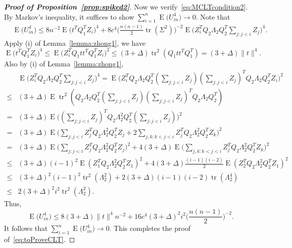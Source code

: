 \documentclass[3p]{elsarticle}
\DeclareMathOperator{\mytr}{tr}
\DeclareMathOperator{\myE}{E}
\theoremstyle{plain}
\theoremstyle{definition}
\theoremstyle{remark}
\begin{document}
\begin{proof}[\textbf{Proof of Proposition~\ref{prop:spiked2}}]
     Now we verify~\eqref{eq:MCLTcondition2}.
     By Markov's inequality, it suffices to show $\sum_{i=1}^n \myE\big(U_{in}^4\big)\to 0$.
     Note that
     $$
     \begin{aligned}
         &\myE\big(U_{in}^4\big)
         \leq
         8n^{-2}\myE \big(t^T Q_1^T Z_i\big)^4+
         8c^4  
         \big(\frac{n(n-1)}{2} \mytr(\Sigma^2)\big)^{-2}
         \myE\big( Z_i^T Q_2 \Lambda_2 Q_2^T \sum_{j:j<i}Z_j\big)^4.
     \end{aligned}
     $$
    Apply (i) of Lemma~\ref{lemma:zhong1}, we have
    $$
\myE \big(t^T Q_1^T Z_i\big)^4\leq
         \myE \big( Z_i^T Q_1 t t^T Q_1^T Z_i\big)^2
         \leq (3+\Delta)\mytr^2 (Q_1 t t^T Q_1^T)
         = (3+\Delta) \|t\|^4.
    $$
    Also by (i) of Lemma~\ref{lemma:zhong1},
    $$
    \begin{aligned}
        &
         \myE\big( Z_i^T Q_2 \Lambda_2 Q_2^T \sum_{j:j<i}Z_j\big)^4
         =
        \myE\big( Z_i^T Q_2 \Lambda_2 Q_2^T (\sum_{j:j<i}Z_j)(\sum_{j:j<i}Z_j)^T Q_2 \Lambda_2 Q_2^T Z_i\big)^2
        \\
        \leq &
        (3+\Delta)\myE \mytr^2 (Q_2 \Lambda_2 Q_2^T (\sum_{j:j<i}Z_j)(\sum_{j:j<i}Z_j)^T Q_2 \Lambda_2 Q_2^T)
        \\
        = &
        (3+\Delta)\myE  \Big((\sum_{j:j<i}Z_j)^T Q_2 \Lambda_2^2 Q_2^T (\sum_{j:j<i}Z_j)\Big)^2
        \\
        = &
        (3+\Delta)\myE  \Big(\sum_{j:j<i}Z_j^T Q_2 \Lambda_2^2 Q_2^T Z_j+2\sum_{j,k:k<j<i}Z_j^T Q_2 \Lambda_2^2 Q_2^T Z_k\Big)^2
        \\
        = &
        (3+\Delta)\myE  \Big(\sum_{j:j<i}Z_j^T Q_2 \Lambda_2^2 Q_2^T Z_j \Big)^2+4(3+\Delta)\myE \Big(\sum_{j,k:k<j<i}Z_j^T Q_2 \Lambda_2^2 Q_2^T Z_k\Big)^2
        \\
        \leq &
        (3+\Delta) (i-1)^2 \myE (Z_1^T Q_2 \Lambda_2^2 Q_2^T Z_1)^2 +4(3+\Delta)\frac{(i-1)(i-2)}{2} \myE (Z_2^T Q_2 \Lambda_2^2 Q_2^T Z_1)^2
        \\
        \leq &
        (3+\Delta)^2 (i-1)^2 \mytr^2 (\Lambda_2^2)  +2(3+\Delta)(i-1)(i-2)\mytr(\Lambda_2^4)
        \\
        \leq &
        2(3+\Delta)^2 i^2 \mytr^2 (\Lambda_2^2).
    \end{aligned}
    $$
    Thus,
     $$
         \myE\big(U_{in}^4\big)
         \leq 8 (3+\Delta)\|t\|^4 n^{-2}+
         16 c^4 (3+\Delta)^2 i^2 \big(\frac{n(n-1)}{2}\big)^{-2}.
     $$
     It follows that
     $
         \sum_{i=1}^n \myE\big(U_{in}^4\big)
        \to 0.
     $
     This completes the proof of~\eqref{eq:toProveCLT}.


\end{proof}
\end{document}
